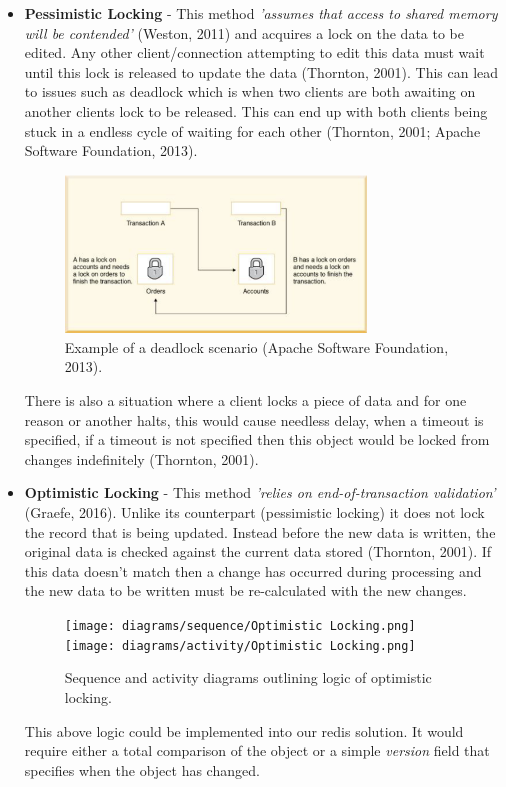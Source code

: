   \begin{itemize}
    \item \textbf{Pessimistic Locking} - This method \textit{'assumes that access to shared memory will be contended'} (Weston, 2011) and
    acquires a lock on the data to be edited. Any other client/connection attempting to edit this data must wait until this lock is released to update
    the data (Thornton, 2001). This can lead to issues such as deadlock which is when two clients are both awaiting on another clients lock to 
    be released. This can end up with both clients being stuck in a endless cycle of waiting for each other (Thornton, 2001; Apache Software Foundation, 2013).

    \begin{figure}[H]
      \centering
      \includegraphics[width=8cm]{assets/deadlock.png}
      \caption{Example of a deadlock scenario (Apache Software Foundation, 2013).}
      \label{fig:deadlock}
    \end{figure}

    There is also a situation where a client locks a piece of data and for one reason or another halts, this would cause needless delay, when a timeout is 
    specified, if a timeout is not specified then this object would be locked from changes indefinitely (Thornton, 2001).

    \item \textbf{Optimistic Locking} - This method \textit{'relies on end-of-transaction validation'} (Graefe, 2016). Unlike its counterpart
    (pessimistic locking) it does not lock the record that is being updated. Instead before the new data is written, the original data is checked against 
    the current data stored (Thornton, 2001). If this data doesn't match then a change has occurred during processing and the new data to be written 
    must be re-calculated with the new changes.

    \begin{figure}[H]
      \centering
      \texttt{[image: diagrams/sequence/Optimistic Locking.png]}
      \texttt{[image: diagrams/activity/Optimistic Locking.png]}
      \caption{Sequence and activity diagrams outlining logic of optimistic locking.}
      \label{fig:optimisticLocking}
    \end{figure}

    This above logic could be implemented into our redis solution. It would require either a total comparison of the object or a simple \textit{version}
    field that specifies when the object has changed.
  \end{itemize}


